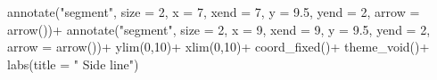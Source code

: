 \documentclass[
  letterpaper,
  DIV=11,
  numbers=noendperiod]{scrreprt}
\newenvironment{Shaded}{\begin{snugshade}}{\end{snugshade}}
\newcommand{\AttributeTok}[1]{\textcolor[rgb]{0.40,0.45,0.13}{#1}}
\newcommand{\DecValTok}[1]{\textcolor[rgb]{0.68,0.00,0.00}{#1}}
\newcommand{\FloatTok}[1]{\textcolor[rgb]{0.68,0.00,0.00}{#1}}
\newcommand{\FunctionTok}[1]{\textcolor[rgb]{0.28,0.35,0.67}{#1}}
\newcommand{\NormalTok}[1]{\textcolor[rgb]{0.00,0.23,0.31}{#1}}
\newcommand{\SpecialCharTok}[1]{\textcolor[rgb]{0.37,0.37,0.37}{#1}}
\newcommand{\StringTok}[1]{\textcolor[rgb]{0.13,0.47,0.30}{#1}}
\begin{document}
\begin{Shaded}
\begin{Highlighting}[]
  \FunctionTok{annotate}\NormalTok{(}\StringTok{"segment"}\NormalTok{, }\AttributeTok{size =} \DecValTok{2}\NormalTok{, }\AttributeTok{x =} \DecValTok{7}\NormalTok{, }\AttributeTok{xend =} \DecValTok{7}\NormalTok{, }\AttributeTok{y =} \FloatTok{9.5}\NormalTok{, }\AttributeTok{yend =} \DecValTok{2}\NormalTok{, }\AttributeTok{arrow =} \FunctionTok{arrow}\NormalTok{())}\SpecialCharTok{+}
  \FunctionTok{annotate}\NormalTok{(}\StringTok{"segment"}\NormalTok{, }\AttributeTok{size =} \DecValTok{2}\NormalTok{, }\AttributeTok{x =} \DecValTok{9}\NormalTok{, }\AttributeTok{xend =} \DecValTok{9}\NormalTok{, }\AttributeTok{y =} \FloatTok{9.5}\NormalTok{, }\AttributeTok{yend =} \DecValTok{2}\NormalTok{, }\AttributeTok{arrow =} \FunctionTok{arrow}\NormalTok{())}\SpecialCharTok{+}
  \FunctionTok{ylim}\NormalTok{(}\DecValTok{0}\NormalTok{,}\DecValTok{10}\NormalTok{)}\SpecialCharTok{+}
  \FunctionTok{xlim}\NormalTok{(}\DecValTok{0}\NormalTok{,}\DecValTok{10}\NormalTok{)}\SpecialCharTok{+}
  \FunctionTok{coord\_fixed}\NormalTok{()}\SpecialCharTok{+}
  \FunctionTok{theme\_void}\NormalTok{()}\SpecialCharTok{+}
  \FunctionTok{labs}\NormalTok{(}\AttributeTok{title =} \StringTok{"      Side line"}\NormalTok{)}


\end{Highlighting}
\end{Shaded}
\end{document}
